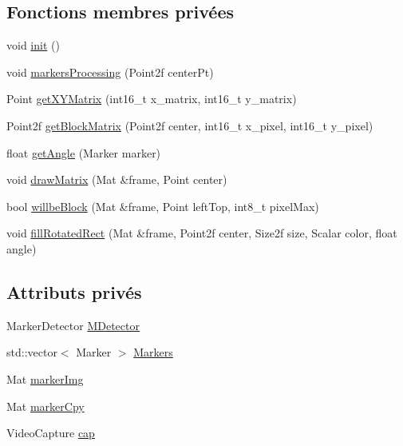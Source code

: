 \subsection*{Fonctions membres privées}
\begin{DoxyCompactItemize}
\item 
void \hyperlink{class_images_p_a0527e504ca88cece33edb90fef958c90}{init} ()
\item 
void \hyperlink{class_images_p_af8bad8cf7cb3be74c084a0efc86ca73f}{markers\-Processing} (Point2f center\-Pt)
\item 
Point \hyperlink{class_images_p_a0b371e65a472c1cce7d6dc83bd171e4d}{get\-X\-Y\-Matrix} (int16\-\_\-t x\-\_\-matrix, int16\-\_\-t y\-\_\-matrix)
\item 
Point2f \hyperlink{class_images_p_a50c2faf5197f1e0b5d54f4acdb9f82dd}{get\-Block\-Matrix} (Point2f center, int16\-\_\-t x\-\_\-pixel, int16\-\_\-t y\-\_\-pixel)
\item 
float \hyperlink{class_images_p_a03b81fad0317e9939085c5e7538c2efe}{get\-Angle} (Marker marker)
\item 
void \hyperlink{class_images_p_a4eee68c40eb47b29e0b738ea38a55353}{draw\-Matrix} (Mat \&frame, Point center)
\item 
bool \hyperlink{class_images_p_a4e8b4ba0f6f6f408de4cc4c52ac29f27}{willbe\-Block} (Mat \&frame, Point left\-Top, int8\-\_\-t pixel\-Max)
\item 
void \hyperlink{class_images_p_aab5950c25ea44c06bc4026ce6dece7fa}{fill\-Rotated\-Rect} (Mat \&frame, Point2f center, Size2f size, Scalar color, float angle)
\end{DoxyCompactItemize}
\subsection*{Attributs privés}
\begin{DoxyCompactItemize}
\item 
Marker\-Detector \hyperlink{class_images_p_a43a0e66ed75a147c27474937f8c9112c}{M\-Detector}
\item 
std\-::vector$<$ Marker $>$ \hyperlink{class_images_p_ac2813bc8a3edac420df686902806172c}{Markers}
\item 
Mat \hyperlink{class_images_p_add620ec27d299fe470cade4a6bc1e632}{marker\-Img}
\item 
Mat \hyperlink{class_images_p_adc6b2ffa6cbfab6c1b83ed4bef74f1b9}{marker\-Cpy}
\item 
Video\-Capture \hyperlink{class_images_p_a143a67baa23fdc4b1c28beda0bd964f5}{cap}
\end{DoxyCompactItemize}


